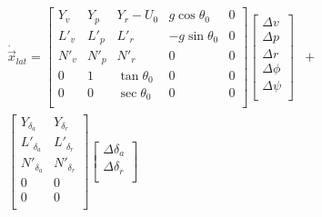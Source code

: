 \begin{align*}
    \dot{\vec{x}}_{lat} =
    \left[ \begin{array}{ *{5}{c} }
            Y_v  & Y_p  & Y_r - U_0     & g \cos \theta_0  & 0 \\
            L'_v & L'_p & L'_r          & -g \sin \theta_0 & 0 \\
            N'_v & N'_p & N'_r          & 0                & 0 \\
            0    & 1    & \tan \theta_0 & 0                & 0 \\
            0    & 0    & \sec \theta_0 & 0                & 0 \\
        \end{array} \right]
    \left[ \begin{array}{ *{1}{c} }
            \Delta v    \\
            \Delta p    \\
            \Delta r    \\
            \Delta \phi \\
            \Delta \psi \\
        \end{array} \right] & + \\
    \left[ \begin{array}{ *{5}{c} }
            Y_{\delta_{a}}  & Y_{\delta_{r}}  \\
            L'_{\delta_{a}} & L'_{\delta_{r}} \\
            N'_{\delta_{a}} & N'_{\delta_{r}} \\
            0               & 0               \\
            0               & 0               \\
        \end{array} \right]
    \left[ \begin{array}{ *{1}{c} }
            \Delta \delta_a \\
            \Delta \delta_r \\
        \end{array} \right] &   \\
\end{align*}
